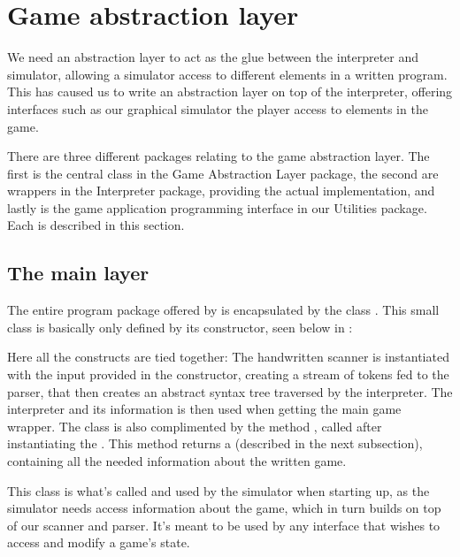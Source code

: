 \section{Game abstraction layer}
\label{sec:gameabstractionlayer}
We need an abstraction layer to act as the glue between the interpreter
and simulator, allowing a simulator access to different elements in a
written program. This has caused us to write an abstraction layer on top
of the interpreter, offering interfaces such as our graphical simulator
the player access to elements in the game.

There are three different packages relating to the game abstraction
layer. The first is the central class in the Game Abstraction Layer
package, the second are wrappers in the Interpreter package, providing
the actual implementation, and lastly is the game application
programming interface in our Utilities package. Each is described in
this section.

\subsection{The main layer}
The entire program package offered by \productname{} is encapsulated by
the class . This small class is basically
only defined by its constructor, seen below in :



Here all the constructs are tied together: The handwritten scanner
is instantiated with the input provided in the constructor, creating
a stream of tokens fed to the parser, that then creates an abstract
syntax tree traversed by the interpreter. The interpreter and its
information is then used when getting the main game wrapper. The class
is also complimented by the method , called after
instantiating the . This method returns a
 (described in the next subsection), containing
all the needed information about the written game.

This class is what's called and used by the simulator when starting up,
as the simulator needs access information about the game, which in turn
builds on top of our scanner and parser. It's meant to be used by any
interface that wishes to access and modify a game's state.

